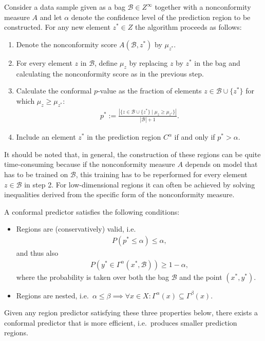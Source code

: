     \begin{construct}\label{data:cp}
        Consider a data sample given as a bag $\mathcal{B}\in Z^\infty$ together with a nonconformity measure $A$ and let $\alpha$ denote the confidence level of the prediction region to be constructed. For any new element $z^*\in Z$ the algorithm proceeds as follows:
        \begin{enumerate}
            \item Denote the nonconformity score $A(\mathcal{B},z^*)$ by $\mu_{z^*}$.
            \item For every element $z$ in $\mathcal{B}$, define $\mu_z$ by replacing $z$ by $z^*$ in the bag and calculating the nonconformity score as in the previous step.
            \item Calculate the conformal $p$-value as the fraction of elements $z\in\mathcal{B}\cup\{z^*\}$ for which $\mu_z\geq\mu_{z^*}$:
                \begin{gather}
                    \label{data:tcp}
                    p^* := \frac{|\{z\in\mathcal{B}\cup\{z^*\}\mid\mu_z\geq\mu_{z^*}\}|}{|\mathcal{B}|+1}.
                \end{gather}
            \item Include an element $z^*$ in the prediction region $C^\alpha$ if and only if $p^*>\alpha$.
        \end{enumerate}
        It should be noted that, in general, the construction of these regions can be quite time-consuming because if the nonconformity measure $A$ depends on model that has to be trained on $\mathcal{B}$, this training has to be reperformed for every element $z\in\mathcal{B}$ in step 2. For low-dimensional regions it can often be achieved by solving inequalities derived from the specific form of the nonconformity measure.
    \end{construct}

    \begin{property}[Optimality]
        A conformal predictor satisfies the following conditions:
        \begin{itemize}
            \item Regions are (conservatively) valid, i.e.
                \begin{gather}
                    P(p^*\leq\alpha)\leq\alpha,
                \end{gather}
                and thus also
                \begin{gather}
                    P(y^*\in\Gamma^\alpha(x^*,\mathcal{B}))\geq1-\alpha,
                \end{gather}
                where the probability is taken over both the bag $\mathcal{B}$ and the point $(x^*,y^*)$.
            \item Regions are nested, i.e.~$\alpha\leq\beta\implies\forall x\in X:\Gamma^\alpha(x)\subseteq\Gamma^\beta(x)$.
        \end{itemize}
        Given any region predictor satisfying these three properties below, there exists a conformal predictor that is more efficient, i.e.~produces smaller prediction regions.
    \end{property}

